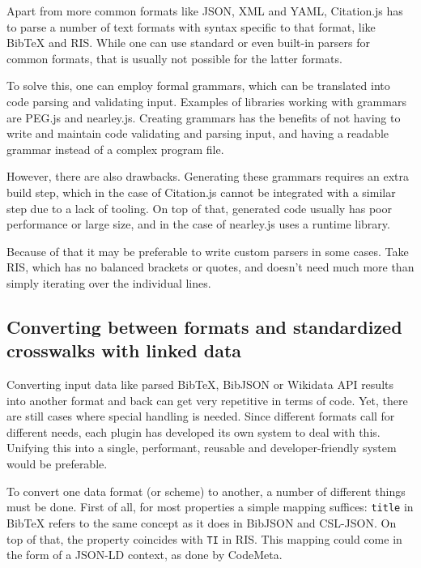 \documentclass[fleqn,10pt,lineno]{wlpeerj} %
\begin{document}
Apart from more common formats like JSON, XML and YAML, Citation.js has to parse a number of text formats with syntax specific to that format, like BibTeX and RIS. While one can use standard or even built-in parsers for common formats, that is usually not possible for the latter formats.

To solve this, one can employ formal grammars, which can be translated into code parsing and validating input. Examples of libraries working with grammars are PEG.js and nearley.js. Creating grammars has the benefits of not having to write and maintain code validating and parsing input, and having a readable grammar instead of a complex program file.

However, there are also drawbacks. Generating these grammars requires an extra build step, which in the case of Citation.js cannot be integrated with a similar step due to a lack of tooling. On top of that, generated code usually has poor performance or large size, and in the case of nearley.js uses a runtime library.

Because of that it may be preferable to write custom parsers in some cases. Take RIS, which has no balanced brackets or quotes, and doesn't need much more than simply iterating over the individual lines.

\subsection*{Converting between formats and standardized crosswalks with linked data}

Converting input data like parsed BibTeX, BibJSON or Wikidata API results into another format and back can get very repetitive in terms of code. Yet, there are still cases where special handling is needed. Since different formats call for different needs, each plugin has developed its own system to deal with this. Unifying this into a single, performant, reusable and developer-friendly system would be preferable.

To convert one data format (or scheme) to another, a number of different things must be done. First of all, for most properties a simple mapping suffices: \texttt{title} in BibTeX refers to the same concept as it does in BibJSON and CSL-JSON. On top of that, the property coincides with \texttt{TI} in RIS. This mapping could come in the form of a JSON-LD context, as done by CodeMeta.
\end{document}
